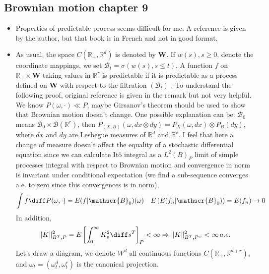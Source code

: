 \subsection{Brownian motion chapter 9}
\begin{itemize}
	
	\item Properties of predictable process seems difficult for me. A reference\cite{dellancherie1976proba} is given by the author, but that book is in French and not in good format.
	\item As usual, the space $C\left(\mathbb{R}_{+}, \mathbb{R}^{d}\right)$ is denoted by $\mathbf{W}$. If $w(s), s \geq 0$, denote the coordinate mappings, we set $\mathscr{B}_{t}=\sigma(w(s), s \leq t)$,  A function $f$ on $\mathbb{R}_{+} \times \mathbf{W}$ taking values in $\mathbb{R}^{r}$ is predictable if it is predictable as a process defined on $\mathbf{W}$ with respect to the filtration $\left( \mathscr{B}_{t}\right)$ .
	To understand the following proof, original reference\cite{ikeda2014stochastic} is given in the remark but not very helpful. We know $ P(\omega,\cdot)\ll P $, maybe Girsanov's theorem should be used to show that Brownian motion doesn't change. One possible explanation can be: $ \mathscr{B}_{0}$ means $ \mathscr{B}_{0} \times \mathscr{B}(\mathbb{R}^r)$, then $ P_{(X,B)}\left( \omega, dx \otimes dy\right) = P_X(\omega, dx)\otimes P_B(dy)  $, where $ dx $ and $ dy $ are Lesbegue measures of $ \mathbb{R}^d $ and $ \mathbb{R}^r $. I feel that here a change of measure doesn't affect the equality of a stochastic differential equation since we can calculate It\^o integral as a $ L^2(B)_P $ limit of simple processes integral with respect to Brownian motion and convergence in norm is invariant under conditional expectation (we find a sub-sequence converges a.e. to zero since this convergences is in norm), 
\[ 
\int f \diff P(\omega,\cdot)=E(f | \mathscr{B}_0)(\omega) \quad E\left( E(f_n | \mathscr{B}_0)\right) =E(f_n) \rightarrow 0
	 \]
	In addition,  
\[
 \|K\|_{B^T,P}^{2}=E\left[\int_{0}^{\infty} K_{s}^{2} \diff s^T\right]_P < \infty \Rightarrow \|K\|_{B^T, P^\omega}^{2}< \infty \, a.e.
 \]
	 Let's draw a diagram,  we denote $ W^d$ all continuous functions $C\left(\mathbb{R}_{+}, \mathbb{R}^{d+r}\right) $, and $ \omega_t= (\omega^d_t,\omega^r_t)$ is the canonical projection.\\
\end{itemize}
